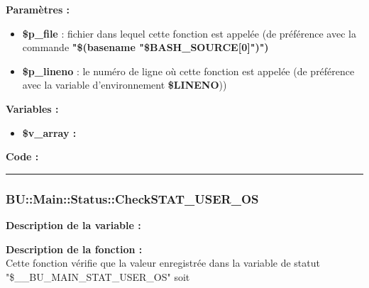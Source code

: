 \documentclass[a4paper,10pt]{article}
\begin{document}
\begin{justify}
    \textbf{Paramètres :}

    \begin{itemize}
        \item \color{orange}\textbf{\$p\_file}\color{white} : fichier dans lequel cette fonction est appelée (de préférence avec la commande \textbf{"\$(\color{gray}basename \color{white}"\color{orange}\$BASH\_SOURCE[0]\color{white}")")}\\

        \item \color{orange}\textbf{\$p\_lineno}\color{white} : le numéro de ligne où cette fonction est appelée (de préférence avec la variable d'environnement \textbf{\color{orange}\$LINENO}))
    \end{itemize}
\end{justify}

\begin{justify}
    \textbf{Variables :}

    \begin{itemize}
        \item \textbf{\color{orange}\$v\_array\color{white} :}
    \end{itemize}
\end{justify}

\begin{justify}
    \textbf{Code :}
\end{justify}



\color{blue}\par\noindent\rule{\textwidth}{0.4pt}\color{white}

\color{blue}
\subsubsection{\color{mauve}BU::Main::Status::CheckSTAT\_USER\_OS}\color{white}

\begin{justify}
    \textbf{Description de la variable :}\\
    
\end{justify}

\begin{justify}
    \textbf{Description de la fonction :}\\
    Cette fonction vérifie que la valeur enregistrée dans la variable de statut "\$\_\_BU\_MAIN\_STAT\_USER\_OS" soit
\end{justify}
\end{document}
